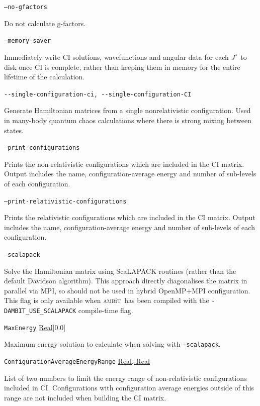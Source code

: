 \documentclass{report}
\newcommand{\ambit}{\textsc{amb}{\footnotesize i}\textsc{t}}
\begin{document}
\texttt{--no-gfactors} 
\begin{adjustwidth}{1cm}{}
Do not calculate g-factors.
\end{adjustwidth}

\texttt{--memory-saver}
\begin{adjustwidth}{1cm}{}
Immediately write CI solutions, wavefunctions and angular data for each $J^{\pi}$ to disk once CI is 
complete, rather than keeping them in memory for the entire lifetime of the calculation. 
\end{adjustwidth}

\texttt{{-}{-}single-configuration-ci, {-}{-}single-configuration-CI}
\begin{adjustwidth}{1cm}{}
Generate Hamiltonian matrices from a single nonrelativistic configuration. Used in many-body quantum
chaos calculations where there is strong mixing between states.
\end{adjustwidth}

\texttt{--print-configurations}
\begin{adjustwidth}{1cm}{}
Prints the non-relativistic configurations which are included in the CI matrix.
Output includes the name, configuration-average energy and number of sub-levels of each configuration.
\end{adjustwidth}

\texttt{--print-relativistic-configurations}
\begin{adjustwidth}{1cm}{}
Prints the relativistic configurations which are included in the CI matrix.
Output includes the name, configuration-average energy and number of sub-levels of each configuration.
\end{adjustwidth}

\texttt{--scalapack}
\begin{adjustwidth}{1cm}{}
Solve the Hamiltonian matrix using ScaLAPACK routines (rather than the default Davidson algorithm). 
This approach directly diagonalises the matrix in parallel via MPI, so should not be used in hybrid
OpenMP+MPI configuration. This flag is only available when \ambit\ has been compiled with the
\texttt{-DAMBIT\_USE\_SCALAPACK} compile-time flag.
\end{adjustwidth}

\texttt{MaxEnergy} \uline{Real}[0.0]
\begin{adjustwidth}{1cm}{}
Maximum energy solution to calculate when solving with \texttt{--scalapack}.
\end{adjustwidth}

\texttt{ConfigurationAverageEnergyRange} \uline{Real, Real}
\begin{adjustwidth}{1cm}{}
List of two numbers to limit the energy range of non-relativistic configurations included in CI.
Configurations with configuration average energies outside of this range are not included when building
the CI matrix.
\end{adjustwidth}
\end{document}
